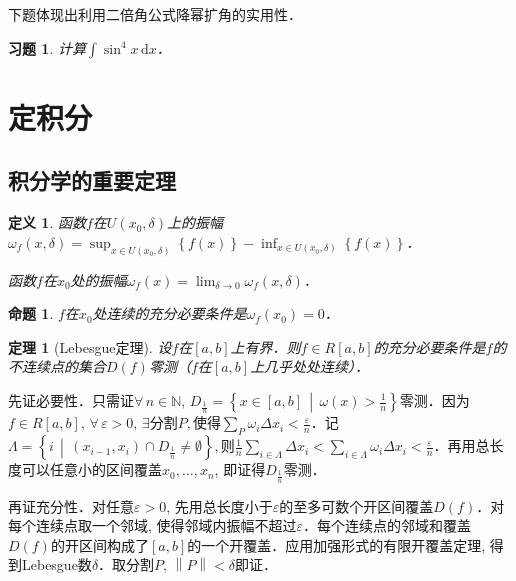 \documentclass[11pt,a4paper]{ctexart}
\makeatletter
\theoremstyle{thmseries} %
\newtheorem{thm}{定理}[section]
\newtheorem{prop}{命题}[section]
\theoremstyle{exerseries}
\newtheorem{defn}{定义}[section]
\newtheorem{exer}{习题}[section]
\renewenvironment{proof}[1][\proofname]{\par
  \pushQED{\qed}%
  \normalfont \topsep6\p@\@plus6\p@\relax
  \trivlist
  \item[\hskip\labelsep
        \itshape
    #1\@addpunct{}]\ignorespaces
}{%
  \popQED\endtrivlist\@endpefalse
}
\newenvironment{sol}{\begin{proof}[\bfseries\upshape 解\quad]}{\end{proof}}
\newenvironment{pf}{\begin{proof}[\bfseries\upshape 证\quad]}{\end{proof}}
\newcommand{\cbra}[1]{\mathopen{}\left\{#1\right\}}
\renewcommand{\epsilon}{\varepsilon}
\newcommand{\N}{\mathbb{N}}
\renewcommand{\d}{\mathrm{d}}
\newcommand{\norm}[1]{\left\lVert #1 \right\rVert}
\makeatother
\begin{document}
下题体现出利用二倍角公式降幂扩角的实用性．
\begin{exer}
	计算$\int \sin^4x\,\d x$．
\end{exer}



\section{定积分}
\subsection{积分学的重要定理}
\begin{defn}
	函数$f$在$U(x_0,\delta)$上的振幅$\omega_f(x,\delta)=\sup_{x\in U(x_0,\delta)}\cbra{f(x)}-\inf_{x\in U(x_0,\delta)}\cbra{f(x)}$．
	
	函数$f$在$x_0$处的振幅$\omega_f(x)=\lim_{\delta\to 0}\omega_f(x,\delta)$．
\end{defn}

\begin{prop}
	$f$在$x_0$处连续的充分必要条件是$\omega_f(x_0)=0$．
\end{prop}

\begin{thm}[Lebesgue定理]
	设$f$在$[a,b]$上有界．则$f\in R[a,b]$的充分必要条件是$f$的不连续点的集合$D(f)$零测（$f$在$[a,b]$上几乎处处连续）．
\end{thm}
\begin{pf}
	先证必要性．只需证$\forall\,n\in\N,\,D_\frac{1}{n}=\cbra{x\in[a,b]\,\middle\vert\,\omega(x)>\frac{1}{n}}$零测．因为$f\in R[a,b],\,\forall\,\epsilon>0,\,\exists$分割$P,$使得$\sum_P\omega_i\Delta x_i<\frac{\epsilon}{n}$．记$\Lambda=\cbra{i\,\middle\vert\,(x_{i-1},x_i)\cap D_\frac{1}{n}\neq\emptyset},$则$\frac{1}{n}\sum_{i\in\Lambda}\Delta x_i<\sum_{i\in\Lambda}\omega_i\Delta x_i<\frac{\epsilon}{n}$．再用总长度可以任意小的区间覆盖$x_0,\dots,x_n$, 即证得$D_\frac{1}{n}$零测．

	再证充分性．对任意$\epsilon>0$, 先用总长度小于$\epsilon$的至多可数个开区间覆盖$D(f)$．对每个连续点取一个邻域, 使得邻域内振幅不超过$\epsilon$．每个连续点的邻域和覆盖$D(f)$的开区间构成了$[a,b]$的一个开覆盖．应用加强形式的有限开覆盖定理, 得到Lebesgue数$\delta$．取分割$P,\,\norm{P}<\delta$即证．
\end{pf}
\end{document}
